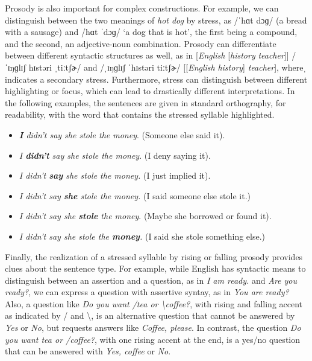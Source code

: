 Prosody is also important for complex constructions. For example, we can distinguish between the two meanings of \textit{hot dog} by stress, as /ˈhɑt dɔɡ/ (a bread with a sausage) and /hɑt ˈdɔɡ/ ‘a dog that is hot’, the first being a compound, and the second, an adjective-noun combination. Prosody can differentiate between different syntactic structures as well, as in [\textit{English} [\textit{history} \textit{teacher}]] /ˈɪŋɡlɪʃ hɪstəri ˌtiːtʃɚ/ and /ˌɪŋɡlɪʃ ˈhɪstəri tiːtʃɚ/ [[\textit{English} \textit{history}] \textit{teacher}], whereˌ indicates a secondary stress. Furthermore, stress can distinguish between different highlighting or focus, which can lead to drastically different interpretations. In the following examples, the sentences are given in standard orthography, for readability, with the word that contains the stressed syllable highlighted.

\begin{itemize}
    \item \textit{\textbf{I} didn’t say she stole the money}. (Someone else said it).
    \item \textit{I \textbf{didn’t }say she stole the money}. (I deny saying it).
    \item \textit{I didn’t \textbf{say} she stole the money.}	(I just implied it).
    \item \textit{I didn’t say \textbf{she} stole the money.} (I said someone else stole it.)
    \item \textit{I didn’t say she \textbf{stole} the money}. (Maybe she borrowed or found it).
    \item \textit{I didn’t say she stole the \textbf{money}.} (I said she stole something else.)
\end{itemize}

Finally, the realization of a stressed syllable by rising or falling prosody provides clues about the sentence type. For example, while English has syntactic means to distinguish between an assertion and a question, as in \textit{I am ready.} and \textit{Are you ready?}, we can express a question with assertive syntay, as in \textit{You are ready?} Also, a question like \textit{Do you want /tea or \textbackslash coffee?}, with rising and falling accent as indicated by / and \textbackslash, is an alternative question that cannot be answered by \textit{Yes} or \textit{No}, but requests answers like \textit{Coffee, please}. In contrast, the question \textit{Do you want tea or /coffee?}, with one rising accent at the end, is a yes/no question that can be answered with \textit{Yes, coffee} or \textit{No}. 

